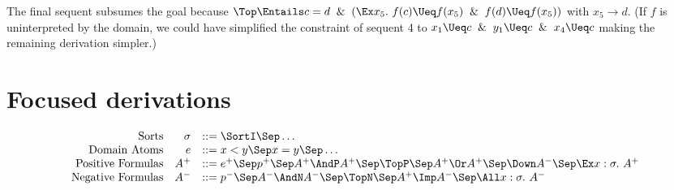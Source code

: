 \begin{example}
  \noindent
  The final sequent subsumes the goal because
  $\Top\Entails c=d\And(\Ex x_5.~f(c)\Ueq f(x_5)\And f(d)\Ueq f(x_5))$
  with $x_5\to d$.  (If $f$ is uninterpreted by the domain, we
  could have simplified the constraint of sequent 4 to
  $x_1\Ueq c\And y_1\Ueq c \And x_4\Ueq c$ making the remaining derivation
  simpler.)

\end{example}

\section{Focused derivations}

\begin{definition}[Formulas]
  \[
  \begin{array}{rrl}
    \mbox{Sorts} &\sigma & ::= \SortI \Sep \ldots \\
    \mbox{Domain Atoms} & e & ::= x < y \Sep x = y \Sep \ldots \\
    \mbox{Positive Formulas} & A^+ & ::= e^+ \Sep p^+ \Sep A^+\AndP A^+\Sep \TopP \Sep A^+\Or A^+ \Sep \Down A^- \Sep \Ex x:\sigma.\ A^+ \\
    \mbox{Negative Formulas} & A^- & ::= p^- \Sep A^-\AndN A^- \Sep \TopN \Sep A^+\Imp A^- \Sep \All x:\sigma.\ A^- \\
  \end{array}
  \]
\end{definition}

